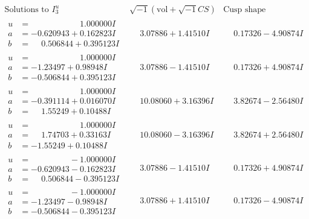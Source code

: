 \documentclass[1p]{elsarticle_modified}
\theoremstyle{definition}
\newcommand{\I}{\sqrt{-1}}
\begin{document}
$$\begin{array}{c|c|c}  
\text{Solutions to }I^u_{3}& \I (\text{vol} + \sqrt{-1}CS) & \text{Cusp shape}\\
 \hline 
\begin{aligned}
u &= \phantom{-0.000000 -}1.000000 I \\
a &= -0.620943 + 0.162823 I \\
b &= \phantom{-}0.506844 + 0.395123 I\end{aligned}
 & \phantom{-}3.07886 + 1.41510 I & \phantom{-}0.17326 - 4.90874 I \\ \hline\begin{aligned}
u &= \phantom{-0.000000 -}1.000000 I \\
a &= -1.23497 + 0.98948 I \\
b &= -0.506844 + 0.395123 I\end{aligned}
 & \phantom{-}3.07886 - 1.41510 I & \phantom{-}0.17326 + 4.90874 I \\ \hline\begin{aligned}
u &= \phantom{-0.000000 -}1.000000 I \\
a &= -0.391114 + 0.016070 I \\
b &= \phantom{-}1.55249 + 0.10488 I\end{aligned}
 & \phantom{-}10.08060 + 3.16396 I & \phantom{-}3.82674 - 2.56480 I \\ \hline\begin{aligned}
u &= \phantom{-0.000000 -}1.000000 I \\
a &= \phantom{-}1.74703 + 0.33163 I \\
b &= -1.55249 + 0.10488 I\end{aligned}
 & \phantom{-}10.08060 - 3.16396 I & \phantom{-}3.82674 + 2.56480 I \\ \hline\begin{aligned}
u &= \phantom{-0.000000 } -1.000000 I \\
a &= -0.620943 - 0.162823 I \\
b &= \phantom{-}0.506844 - 0.395123 I\end{aligned}
 & \phantom{-}3.07886 - 1.41510 I & \phantom{-}0.17326 + 4.90874 I \\ \hline\begin{aligned}
u &= \phantom{-0.000000 } -1.000000 I \\
a &= -1.23497 - 0.98948 I \\
b &= -0.506844 - 0.395123 I\end{aligned}
 & \phantom{-}3.07886 + 1.41510 I & \phantom{-}0.17326 - 4.90874 I \\ \hline\begin{aligned}

\end{aligned}
\end{array}$$
\end{document}
